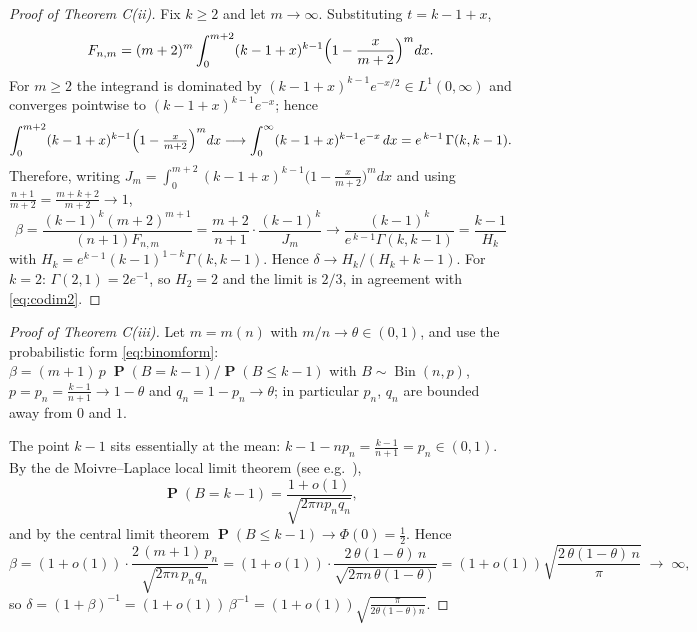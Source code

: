 \documentclass[11pt]{amsart}
\theoremstyle{definition}
\theoremstyle{remark}
\newcommand{\Bin}{\operatorname{Bin}}
\newcommand{\pr}{\operatorname{\mathbf{P}}}
\begin{document}
\begin{proof}[Proof of Theorem C(ii)]
Fix $k\ge2$ and let $m\to\infty$. Substituting $t=k-1+x$,
\[
F_{n,m}=(m+2)^{m}\int_0^{m+2}(k-1+x)^{k-1}
\Bigl(1-\frac{x}{m+2}\Bigr)^{m}dx .
\]
For $m\ge2$ the integrand is dominated by
$(k-1+x)^{k-1}e^{-x/2}\in L^1(0,\infty)$ and converges pointwise to
$(k-1+x)^{k-1}e^{-x}$; hence
\[
\int_0^{m+2}(k-1+x)^{k-1}\Bigl(1-\tfrac{x}{m+2}\Bigr)^{m}dx
\longrightarrow
\int_0^\infty(k-1+x)^{k-1}e^{-x}\,dx
= e^{\,k-1}\,\Gamma(k,k-1).
\]
Therefore, writing
$J_m=\int_0^{m+2}(k-1+x)^{k-1}\bigl(1-\tfrac{x}{m+2}\bigr)^{m}dx$ and
using $\tfrac{n+1}{m+2}=\tfrac{m+k+2}{m+2}\to1$,
\[
\beta=\frac{(k-1)^{k}(m+2)^{m+1}}{(n+1)F_{n,m}}
=\frac{m+2}{n+1}\cdot\frac{(k-1)^{k}}{J_m}
\longrightarrow
\frac{(k-1)^{k}}{e^{\,k-1}\Gamma(k,k-1)}
=\frac{k-1}{H_k}
\]
with $H_k=e^{k-1}(k-1)^{1-k}\Gamma(k,k-1)$. Hence
$\delta\to H_k/(H_k+k-1)$. For $k=2$:
$\Gamma(2,1)=2e^{-1}$, so $H_2=2$ and the limit is $2/3$, in agreement
with \eqref{eq:codim2}.
\end{proof}

\begin{proof}[Proof of Theorem C(iii)]
Let $m=m(n)$ with $m/n\to\theta\in(0,1)$, and use the probabilistic
form \eqref{eq:binomform}: $\beta=(m+1)\,p\;
\pr(B=k-1)/\pr(B\le k-1)$ with $B\sim\Bin(n,p)$,
$p=p_n=\tfrac{k-1}{n+1}\to1-\theta$ and $q_n=1-p_n\to\theta$; in
particular $p_n$, $q_n$ are bounded away from $0$ and $1$.

The point $k-1$ sits essentially at the mean:
$k-1-np_n=\tfrac{k-1}{n+1}=p_n\in(0,1)$. By the de Moivre--Laplace
local limit theorem (see e.g.\ \cite[VII.3]{Feller68}),
\[
\pr(B=k-1)=\frac{1+o(1)}{\sqrt{2\pi n p_nq_n}},
\]
and by the central limit theorem
$\pr(B\le k-1)\to\Phi(0)=\tfrac12$. Hence
\[
\beta=(1+o(1))\cdot\frac{2\,(m+1)\,p_n}{\sqrt{2\pi n\,p_nq_n}}
=(1+o(1))\cdot\frac{2\,\theta(1-\theta)\,n}{\sqrt{2\pi
n\,\theta(1-\theta)}}
=(1+o(1))\sqrt{\frac{2\,\theta(1-\theta)\,n}{\pi}}\;\to\;\infty,
\]
so
$\delta=(1+\beta)^{-1}=(1+o(1))\,\beta^{-1}
=(1+o(1))\sqrt{\tfrac{\pi}{2\theta(1-\theta)n}}$.
\end{proof}
\end{document}
